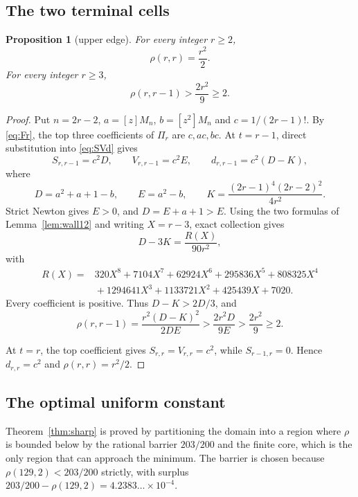 \documentclass[11pt,a4paper]{article}
\theoremstyle{plain}
\newtheorem{proposition}[theorem]{Proposition}
\theoremstyle{definition}
\theoremstyle{remark}
\begin{document}
\subsection{The two terminal cells}

\begin{proposition}[upper edge]\label{prop:upperedge}
For every integer $r\ge2$,
\[
  \rho(r,r)=\frac{r^2}{2}.
\]
For every integer $r\ge3$,
\[
  \rho(r,r-1)>\frac{2r^2}{9}\ge2.
\]
\end{proposition}

\begin{proof}
Put $n=2r-2$, $a=[z]M_n$, $b=[z^2]M_n$ and
$c=1/(2r-1)!$. By \eqref{eq:Fr}, the top three coefficients of $\Pi_r$ are
$c,ac,bc$. At $t=r-1$, direct substitution into \eqref{eq:SVd} gives
\[
  S_{r,r-1}=c^2D,\qquad V_{r,r-1}=c^2E,\qquad
  d_{r,r-1}=c^2(D-K),
\]
where
\[
  D=a^2+a+1-b,\qquad E=a^2-b,\qquad
  K=\frac{(2r-1)^4(2r-2)^2}{4r^2}.
\]
Strict Newton gives $E>0$, and $D=E+a+1>E$. Using the two formulas of
Lemma~\ref{lem:wall12} and writing $X=r-3$, exact collection gives
\[
  D-3K=\frac{R(X)}{90r^2},
\]
with
\[
\begin{aligned}
R(X)={}&320X^8+7104X^7+62924X^6+295836X^5+808325X^4\\
     &{}+1294641X^3+1133721X^2+425439X+7020.
\end{aligned}
\]
Every coefficient is positive. Thus $D-K>2D/3$, and
\[
  \rho(r,r-1)=\frac{r^2(D-K)^2}{2DE}
  >\frac{2r^2D}{9E}>\frac{2r^2}{9}\ge2.
\]

At $t=r$, the top coefficient gives
$S_{r,r}=V_{r,r}=c^2$, while $S_{r-1,r}=0$. Hence $d_{r,r}=c^2$ and
$\rho(r,r)=r^2/2$.
\end{proof}

\subsection{The optimal uniform constant}\label{sec:sharp}

Theorem~\ref{thm:sharp} is proved by partitioning the domain into a region where
$\rho$ is bounded below by the rational barrier $203/200$ and the finite core,
which is the only region that can approach the minimum. The barrier is chosen
because $\rho(129,2)<203/200$ strictly, with surplus
$203/200-\rho(129,2)=4.2383\ldots\times10^{-4}$.
\end{document}
